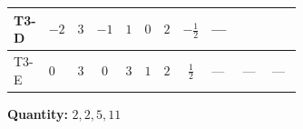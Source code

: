 \documentclass[8pt]{article}
\begin{document}
\begin{landscape}
\begin{longtable}{@{}llcccccc >{\raggedright\arraybackslash}p{0.21\linewidth} >{\raggedright\arraybackslash}p{0.21\linewidth} >{\raggedright\arraybackslash}p{0.21\linewidth}@{}}
\midrule
T3-D & $-2$ & $3$ & $-1$ & $1$ & $0$ & $2$ & $-\frac{1}{2}$ & --- & \scriptsize\adjustbox{max width=\linewidth}{$\begin{gathered} \frac{3^{\frac{3}{4}} lambda12Inv1 \overline{y_{1}} \overline{y_{2}}}{6 MF}\end{gathered}$} & \scriptsize\adjustbox{max width=\linewidth}{$\begin{gathered} \frac{3^{\frac{3}{4}} g_{1}^{2} \overline{y_{1}} \overline{y_{2}}}{8 MF}\end{gathered}$} \\
\midrule
T3-E & $0$ & $3$ & $0$ & $3$ & $1$ & $2$ & $\frac{1}{2}$ & --- & --- & --- \\
\midrule
\bottomrule
\end{longtable}
\clearpage
\noindent\textbf{Quantity: }$\mathrm{2,2,5,11}$\par\smallskip

\end{landscape}
\end{document}
